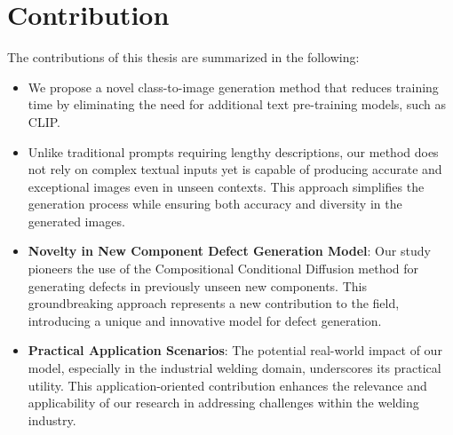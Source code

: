\section{Contribution}
The contributions of this thesis are summarized in the following:
\begin{itemize}
    \item We propose a novel class-to-image generation method that reduces training time by eliminating the need for additional text pre-training models, such as CLIP\cite{CLIP}.
    \item Unlike traditional prompts requiring lengthy descriptions, our method does not rely on complex textual inputs yet is capable of producing accurate and exceptional images even in unseen contexts. This approach simplifies the generation process while ensuring both accuracy and diversity in the generated images.
    \item \textbf{Novelty in New Component Defect Generation Model}: Our study pioneers the use of the Compositional Conditional Diffusion method for generating defects in previously unseen new components. This groundbreaking approach represents a new contribution to the field, introducing a unique and innovative model for defect generation.
    \item \textbf{Practical Application Scenarios}: The potential real-world impact of our model, especially in the industrial welding domain, underscores its practical utility. This application-oriented contribution enhances the relevance and applicability of our research in addressing challenges within the welding industry.
\end{itemize}

